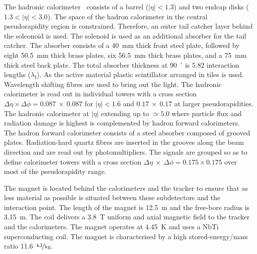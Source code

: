 The hadronic calorimeter~\cite{HCAL_report} consists of a barrel ($\left|\eta\right|<1.3$) and two endcap disks ($1.3<\left|\eta\right|<3.0 $). The space of the hadron calorimeter in the central pseudorapidity region is constrained. Therefore, an outer tail catcher layer behind the soleonoid is used. The solenoid is used as an additional absorber for the tail catcher. The absorber consists of a 40~mm thick front steel plate, followed by eight 50.5~mm thick brass plates, six 56.5~mm thick brass plates, and a 75~mm thick steel back plate. The total absorber thickness at 90~$^{\circ}$ is 5.82 interaction lengths ($\lambda_{\text{I}}$). As the active material plastic scintillator arranged in tiles is used. Wavelength shifting fibres are used to bring out the light. The hadronic calorimeter is read out in individual towers with a cross section $\Delta\eta\times\Delta\phi=0.087~\times~0.087$ for $\left|\eta\right|<1.6$ and $0.17~\times~0.17$ at larger pseudorapidities. The hadronic calorimeter at  $\left|\eta\right|$ extending up to $\simeq5.0$ where particle flux and radiation damage is highest is complemented by hadron forward calorimeters. The hadron forward calorimeter consists of a steel absorber composed of grooved plates. Radiation-hard quartz fibres are inserted in the grooves along the beam direction and are read out by photomultipliers. The signals are grouped so as to define calorimeter towers with a cross section $\Delta\eta~\times~\Delta\phi=0.175\times0.175$ over most of the pseudorapidity range. 

The magnet is located behind the calorimeters and the tracker to ensure that as less material as possible is situated between these subdetectors and the interaction point. The length of the magnet is 12.5~m and the free-bore radius is 3.15~m. The coil delivers a 3.8~T uniform and axial magnetic field to the tracker and the calorimeters. The magnet operates at 4.45~K and uses a NbTi superconducting coil. The magnet is characterised by a high stored-energy/mass ratio 11.6~$\nicefrac{\text{kJ}}{\text{kg}}$.

